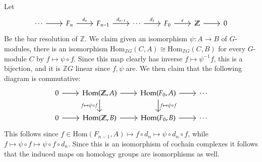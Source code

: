 \documentclass[12pt]{article}
\theoremstyle{definitionstyle}
\def\mbb#1{\mathbb{#1}}
\def\ve{\varepsilon}
\newcommand{\Z}{\mbb Z}
\newcommand{\Hom}{\mathrm{Hom}}
\begin{document}
\begin{enumerate}
        Let 
        \[\begin{tikzcd}
            \cdots & {F_n} & {F_{n-1}} & \cdots & {F_0} & \Z & 0
            \arrow[from=1-1, to=1-2]
            \arrow["{d_n}", from=1-2, to=1-3]
            \arrow["{d_{n-1}}", from=1-3, to=1-4]
            \arrow["{d_1}", from=1-4, to=1-5]
            \arrow["\ve", from=1-5, to=1-6]
            \arrow[from=1-6, to=1-7]
        \end{tikzcd}\]
        Be the bar resolution of $\Z$. We claim given an isomorphism $\psi: A \to B$ of $G$-modules, there is an isomorphism $\Hom_{\Z G}(C, A) \cong \Hom_{\Z G}(C, B)$ for every $G$-module $C$ by $f \mapsto \psi \circ f$. Since this map clearly has inverse $f \mapsto \psi^{-1} f$, this is a bijection, and it is $\Z G$ linear since $f, \psi$ are. We then claim that the following diagram is commutative:
        \[\begin{tikzcd}
            0 & {\Hom(\Z, A)} & {\Hom(F_0,A)} & \cdots \\
            0 & {\Hom(\Z,B)} & {\Hom(F_0, B)} & \cdots
            \arrow[from=1-1, to=1-2]
            \arrow[from=1-2, to=1-3]
            \arrow["{f \mapsto \psi \circ f}"', from=1-2, to=2-2]
            \arrow[from=1-3, to=1-4]
            \arrow["{f \mapsto \psi \circ f}", from=1-3, to=2-3]
            \arrow[from=2-1, to=2-2]
            \arrow[from=2-2, to=2-3]
            \arrow[from=2-3, to=2-4]
        \end{tikzcd}\]
        This follows since $f \in \Hom(F_{n-1}, A) \mapsto  f \circ d_n \mapsto \psi \circ d_n \circ f$, while $f \mapsto \psi \circ f \mapsto \psi \circ f \circ d_n$. Since this is an isomorphism of cochain complexes it follows that the induced maps on homology groups are isomorphisms as well.


\end{enumerate}
\end{document}
